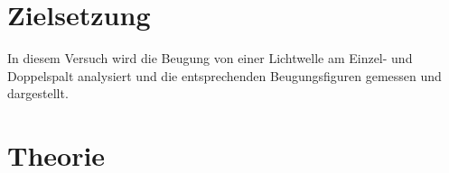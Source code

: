 \section{Zielsetzung}
\label{sec:Zielsetzung}
In diesem Versuch wird die Beugung von einer Lichtwelle am Einzel- und Doppelspalt analysiert und die entsprechenden Beugungsfiguren gemessen und dargestellt.

\section{Theorie}
\label{sec:Theorie}


